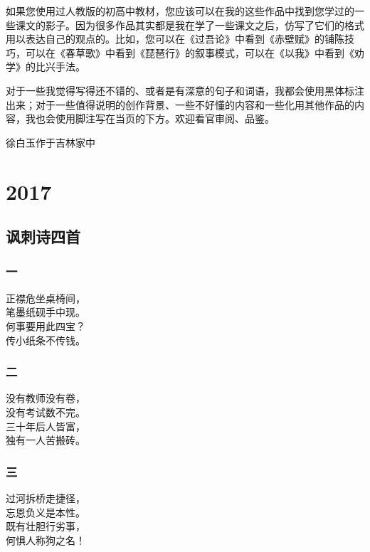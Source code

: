 \documentclass[a5paper]{ctexart}
\begin{document}
	如果您使用过人教版的初高中教材，您应该可以在我的这些作品中找到您学过的一些课文的影子。因为很多作品其实都是我在学了一些课文之后，仿写了它们的格式用以表达自己的观点的。比如，您可以在《过吾论》中看到《赤壁赋》的铺陈技巧，可以在《春草歌》中看到《琵琶行》的叙事模式，可以在《以我》中看到《劝学》的比兴手法。
	
	对于一些我觉得写得还不错的、或者是有深意的句子和词语，我都会使用黑体标注出来；对于一些值得说明的创作背景、一些不好懂的内容和一些化用其他作品的内容，我也会使用脚注写在当页的下方。欢迎看官审阅、品鉴。
	
	\begin{flushright}
		 徐白玉作于吉林家中
	\end{flushright}
	
	
	\newpage
	\section{2017}
	\subsection{讽刺诗四首}
	\subsubsection{一}
	\begin{center}
		正襟危坐桌椅间，\\
		笔墨纸砚手中现。\\
		何事要用此四宝？\\
		传小纸条不传钱。
		
	\end{center}
	\subsubsection{二}
	\begin{center}
		没有教师没有卷，\\
		没有考试数不完。\\
		三十年后人皆富，\\
		独有一人苦搬砖。
	\end{center}

	
	\subsubsection{三}
	\begin{center}
		过河拆桥走捷径，\\
		忘恩负义是本性。\\
		既有壮胆行劣事，\\
		何惧人称狗之名！
	\end{center}
\end{document}
